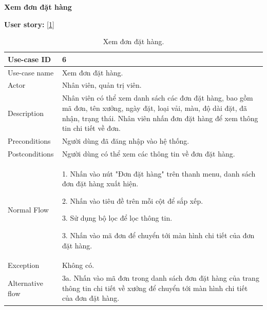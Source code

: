 \newpage
\textbf{Xem đơn đặt hàng}\par
\textbf{User story:} [\ref{bang6}]
\begin{table}[!htp]
    \centering
    \begin{tabular}{|m{3cm}|m{10cm}|}
    \hline 
        Use-case ID & 6\\ \hline
        Use-case name & Xem đơn đặt hàng.\\ \hline
        Actor & Nhân viên, quản trị viên.\\ \hline
        Description & Nhân viên có thể xem danh sách các đơn đặt hàng, bao gồm mã đơn, tên xưởng, ngày đặt, loại vải, màu, độ dài đặt, đã nhận, trạng thái. Nhân viên nhấn đơn đặt hàng để xem thông tin chi tiết về đơn.\\ \hline
        Preconditions & Người dùng đã đăng nhập vào hệ thống.\\ \hline
        Postconditions & Người dùng có thể xem các thông tin về đơn đặt hàng.\\ \hline
        Normal Flow & 
        1. Nhấn vào nút "Đơn đặt hàng" trên thanh menu, danh sách đơn đặt hàng xuất hiện.\par
        2. Nhấn vào tiêu đề trên mỗi cột để sắp xếp.\par
        3. Sử dụng bộ lọc để lọc thông tin.\par
        3. Nhấn vào mã đơn để chuyển tới màn hình chi tiết của đơn đặt hàng.
        \\ \hline
        Exception & Không có.\\ \hline
        Alternative flow & 
        3a. Nhấn vào mã đơn trong danh sách đơn đặt hàng của trang thông tin chi tiết về xưởng để chuyển tới màn hình chi tiết của đơn đặt hàng.
        \\ 
    \hline 
    \end{tabular}
    \caption{Xem đơn đặt hàng.}
    \label{bang6}
\end{table}

